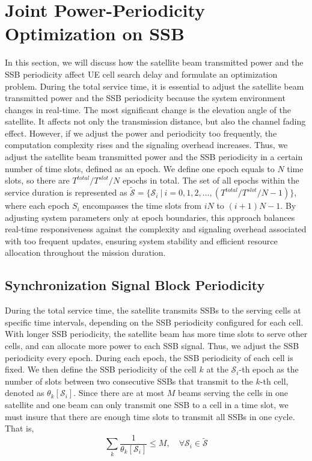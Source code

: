 \section{Joint Power-Periodicity Optimization on SSB}
In this section, we will discuss how the satellite beam transmitted power and the SSB periodicity affect UE cell search delay and formulate an optimization problem. 
During the total service time, it is essential to adjust the satellite beam transmitted power and the SSB periodicity because the system environment changes in real-time. The most significant change is the elevation angle of the satellite. It affects not only the transmission distance, but also the channel fading effect. However, if we adjust the power and periodicity too frequently, the computation complexity rises and the signaling overhead increases. Thus, we adjust the satellite beam transmitted power and the SSB periodicity in a certain number of time slots, defined as an epoch. We define one epoch equals to $N$ time slots, so there are $T^{total} / T^{slot} / N$ epochs in total. The set of all epochs within the service duration is represented as $\mathcal{\widetilde{S}} = \{\mathcal{S}_i\ |\ i = 0, 1, 2, \ldots, (T^{total} / T^{slot} / N - 1)\}$, where each epoch $S_i$ encompasses the time slots from $iN$ to $(i + 1)N - 1$. By adjusting system parameters only at epoch boundaries, this approach balances real-time responsiveness against the complexity and signaling overhead associated with too frequent updates, ensuring system stability and efficient resource allocation throughout the mission duration.

\subsection{Synchronization Signal Block Periodicity}

During the total service time, the satellite transmits SSBs to the serving cells at specific time intervals, depending on the SSB periodicity configured for each cell. With longer SSB periodicity, the satellite beam has more time slots to serve other cells, and can allocate more power to each SSB signal. Thus, we adjust the SSB periodicity every epoch. During each epoch, the SSB periodicity of each cell is fixed. We then define the SSB periodicity of the cell $k$ at the $\mathcal{S}_i$-th epoch as the number of slots between two consecutive SSBs that transmit to the $k$-th cell, denoted as $\theta_k[\mathcal{S}_i]$. Since there are at most $M$ beams serving the cells in one satellite and one beam can only transmit one SSB to a cell in a time slot, we must insure that there are enough time slots to transmit all SSBs in one cycle. That is, 
\begin{equation}
\sum_k \frac{1}{\theta_k[\mathcal{S}_i]} \leq M, \quad \forall \mathcal{S}_i\in\mathcal{\widetilde{S}}
\end{equation}


